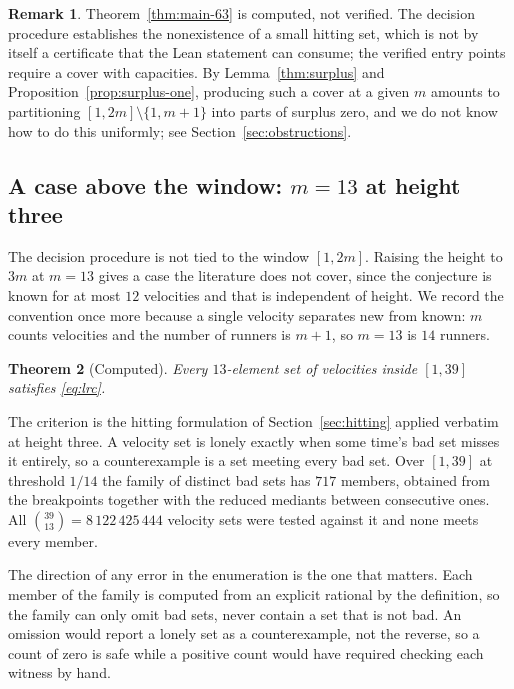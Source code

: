 \documentclass[11pt]{amsart}
\theoremstyle{plain}
\newtheorem{theorem}{Theorem}[section]
\theoremstyle{definition}
\newtheorem{remark}[theorem]{Remark}
\begin{document}
\begin{remark}\label{rem:lift}
Theorem~\ref{thm:main-63} is computed, not verified. The decision procedure establishes the
nonexistence of a small hitting set, which is not by itself a certificate that the Lean statement
can consume; the verified entry points require a cover with capacities. By Lemma~\ref{thm:surplus}
and Proposition~\ref{prop:surplus-one}, producing such a cover at a given $m$ amounts to
partitioning $[1,2m] \setminus \{1,m+1\}$ into parts of surplus zero, and we do not know how to do
this uniformly; see Section~\ref{sec:obstructions}.
\end{remark}

\subsection*{A case above the window: $m = 13$ at height three}

The decision procedure is not tied to the window $[1,2m]$. Raising the height to $3m$ at $m = 13$
gives a case the literature does not cover, since the conjecture is known for at most $12$
velocities and that is independent of height. We record the convention once more because a single
velocity separates new from known: $m$ counts velocities and the number of runners is $m+1$, so
$m = 13$ is $14$ runners.

\begin{theorem}[Computed]\label{thm:k3m13}
Every $13$-element set of velocities inside $[1,39]$ satisfies \eqref{eq:lrc}.
\end{theorem}

The criterion is the hitting formulation of Section~\ref{sec:hitting} applied verbatim at height
three. A velocity set is lonely exactly when some time's bad set misses it entirely, so a
counterexample is a set meeting every bad set. Over $[1,39]$ at threshold $1/14$ the family of
distinct bad sets has $717$ members, obtained from the breakpoints together with the reduced
mediants between consecutive ones. All $\binom{39}{13} = 8\,122\,425\,444$ velocity sets were
tested against it and none meets every member.

The direction of any error in the enumeration is the one that matters. Each member of the family is
computed from an explicit rational by the definition, so the family can only omit bad sets, never
contain a set that is not bad. An omission would report a lonely set as a counterexample, not the
reverse, so a count of zero is safe while a positive count would have required checking each witness
by hand.
\end{document}
